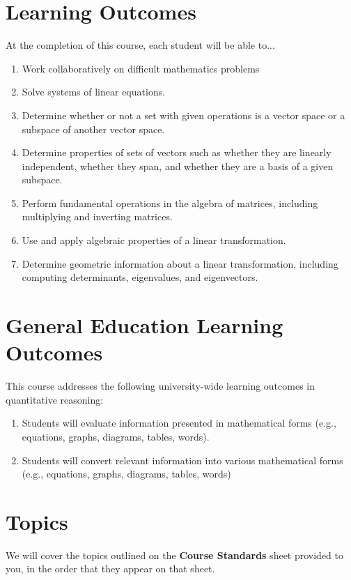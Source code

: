 \documentclass{article}
\begin{document}
\section*{\fontsize{12}{15}\selectfont Learning Outcomes}
At the completion of this course, each student will be able to...
\begin{enumerate}[1)]
\item Work collaboratively on difficult mathematics problems
\item Solve systems of linear equations.
\item Determine whether or not a set with given operations is a vector space or a subspace of another vector space.
\item Determine properties of sets of vectors such as whether they are linearly independent, whether they span, and whether they are a basis of a given subspace.
\item Perform fundamental operations in the algebra of matrices, including multiplying and inverting matrices.
\item Use and apply algebraic properties of a linear transformation.
\item Determine geometric information about a linear transformation, including computing determinants, eigenvalues, and eigenvectors.
\end{enumerate}

\section*{\fontsize{12}{15}\selectfont General Education Learning Outcomes}
This course addresses the following university-wide learning outcomes in quantitative reasoning:
\begin{enumerate}[1)]
\item Students will evaluate information presented in mathematical forms (e.g., equations, graphs, diagrams, tables, words).
\item Students will convert relevant information into various mathematical forms (e.g., equations, graphs, diagrams, tables, words)
\end{enumerate}


\section*{\fontsize{12}{15}\selectfont Topics}
We will cover the topics outlined on the \textbf{Course Standards}
sheet provided to you, in the order that they appear on that sheet.
\end{document}
